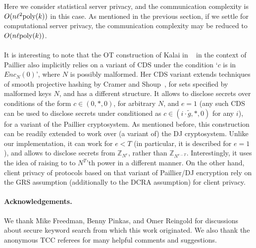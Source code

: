 \documentclass[11pt]{article}
\newcommand{\poly}{{\mbox{\rm poly}}}
\newcommand{\Z}{\mathbb{Z}}
\newcommand\ot{\mbox{OT}\xspace}
\begin{document}
Here we consider statistical server privacy, and the communication complexity
is $O(n\ell^2\poly(k))$ in this case. As mentioned in the previous section, if we settle for computational server privacy, the communication complexity may be reduced to $O(n\ell \poly(k))$.

\paragraph{} It is interesting to note that the \ot construction of Kalai in ~\cite{T05} in the context
of Paillier also implicitly relies on a variant of CDS under the condition `$c$ is in $Enc_N(0)$', where $N$ is possibly malformed.
Her CDS variant extends techniques of smooth projective hashing by Cramer and Shoup~\cite{addref},
for sets specified by malformed keys $N$, and has a different structure.
It allows to disclose secrets over conditions of the form $c\in(0,*,0)$, for arbitrary $N$, and $e=1$
(any such CDS can be used to disclose secrets under conditioned as $c\in(i\cdot \tilde{g},*,0)$ for any $i$), for a variant of the Paillier cryptosystem. As mentioned before, this construction can be
readily extended to work over (a variant of) the DJ cryptosystem. Unlike our implementation, it can work
for $e<T$ (in particular, it is described for $e=1$), and allows to disclose secrets from $\Z_{N^e}$,
rather than $\Z_{N^{e-T}}$. Interestingly, it uses the idea of raising to to $N^T$'th power in a different manner. On the other hand, client privacy of protocols based on that variant of Paillier/DJ encryption
rely on the GRS assumption (additionally to the DCRA assumption) for client privacy.

\paragraph{Acknowledgements.} We thank Mike Freedman, Benny
Pinkas, and Omer Reingold for discussions about secure keyword
search from which this work originated. We also thank the anonymous
TCC referees for many helpful comments and suggestions.
\end{document}

